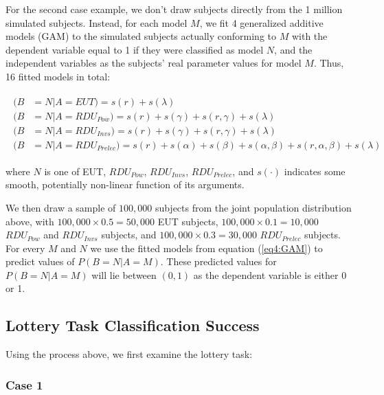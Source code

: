 \documentclass[../main.tex]{subfiles}
\providecommand{\DIFaddbegin}{} %
\providecommand{\DIFaddend}{} %
\begin{document}
For the second case example, we don't draw subjects directly from the 1 million simulated subjects.
Instead, for each model $M$, we fit 4 generalized additive models (GAM) \parencite{Hastie1986} to the simulated subjects actually conforming to $M$ with the dependent variable equal to 1 if they were classified as model $N$, and the independent variables as the subjects' real parameter values for model $M$.
Thus, 16 fitted models in total:
\DIFaddbegin 

\DIFaddend \begin{align}
	\label{eq4:GAM}
	\begin{split}
		(B &= N | A = EUT)                   = s(r) + s(\lambda)\\
		(B &= N | A = \mathit{RDU_{Pow}})    = s(r) + s(\gamma) + s(r, \gamma) + s(\lambda)\\
		(B &= N | A = \mathit{RDU_{Invs}})   = s(r) + s(\gamma) + s(r, \gamma) + s(\lambda)\\
		(B &= N | A = \mathit{RDU_{Prelec}}) = s(r) + s(\alpha) + s(\beta) +s(\alpha, \beta) + s(r, \alpha, \beta) + s(\lambda)
	\end{split}
\end{align}

\noindent where $N$ is one of EUT, $\mathit{RDU_{Pow}}$, $\mathit{RDU_{Invs}}$, $\mathit{RDU_{Prelec}}$, and $s(\cdot)$ indicates some smooth, potentially non-linear function of its arguments.

We then draw a sample of $100,000$ subjects from the joint population distribution above, with $100,000 \times 0.5 = 50,000$ EUT subjects, $100,000 \times 0.1 = 10,000$ $\mathit{RDU_{Pow}}$ and $\mathit{RDU_{Invs}}$ subjects, and $100,000 \times 0.3 = 30,000$ $\mathit{RDU_{Prelec}}$ subjects.
For every $M$ and $N$ we use the fitted models from equation (\ref{eq4:GAM}) to predict values of $P(B = N | A = M)$.
These predicted values for $P(B = N | A = M)$ will lie between $(0, 1)$ as the dependent variable is either 0 or 1.

\subsection{ \texorpdfstring{\textcite{Harrison2016}}{Harrison and Ng (2016)} Lottery Task Classification Success}

Using the process above, we first examine the \textcite{Harrison2016} lottery task:

\subsubsection{Case 1}
\end{document}
